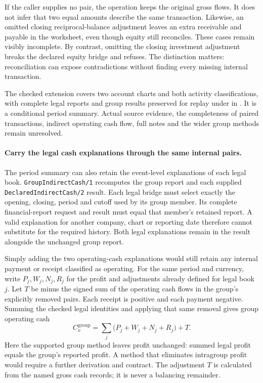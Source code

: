 If the caller supplies no pair, the operation keeps the original gross flows.
It does not infer that two equal amounts describe the same transaction.
Likewise, an omitted closing reciprocal-balance adjustment leaves an extra
receivable and payable in the worksheet, even though equity still reconciles.
These cases remain visibly incomplete. By contrast, omitting the closing
investment adjustment breaks the declared equity bridge and refuses. The
distinction matters: reconciliation can expose contradictions without finding
every missing internal transaction.

The checked extension covers two account charts and both activity
classifications, with complete legal reports and group results preserved for
replay under  in
. It is a conditional period summary.
Actual source evidence, the completeness of paired transactions, indirect
operating cash flow, full notes and the wider group methods remain unresolved.



\paragraph{Carry the legal cash explanations through the same internal pairs.}
The period summary can also retain the event-level explanations of each legal
book. \texttt{GroupIndirectCash/1} recomputes the group report and each supplied
\texttt{DeclaredIndirectCash/2} result. Each legal bridge must select exactly the
opening, closing, period and cutoff used by its group member. Its complete
financial-report request and result must equal that member's retained report.
A valid explanation for another company, chart or reporting date therefore
cannot substitute for the required history. Both legal explanations remain in
the result alongside the unchanged group report.

Simply adding the two operating-cash explanations would still retain any
internal payment or receipt classified as operating. For the same period and
currency, write $P_j,W_j,N_j,R_j$ for the profit and adjustments already defined
for legal book $j$. Let $T$ be minus the signed sum of the operating cash flows
in the group's explicitly removed pairs. Each receipt is positive and each
payment negative. Summing the checked legal identities and applying that same
removal gives group operating cash
\[
 C_o^{\mathrm{group}}
 =\sum_j\bigl(P_j+W_j+N_j+R_j\bigr)+T.
\]
Here the supported group method leaves profit unchanged: summed legal profit
equals the group's reported profit. A method that eliminates intragroup profit
would require a further derivation and contract. The adjustment $T$ is calculated
from the named gross cash records; it is never a balancing remainder.

